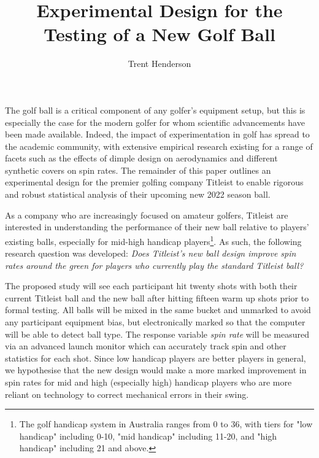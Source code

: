 \documentclass{article}
\begin{document}
\title{\vspace{-4cm}Experimental Design for the Testing of a New Golf Ball}
\author{Trent Henderson}
\date{}

\maketitle

The golf ball is a critical component of any golfer's equipment setup, but this is especially the case for the modern golfer for whom scientific advancements have been made available. 
Indeed, the impact of experimentation in golf has spread to the academic community, with extensive empirical research existing for a range of facets such as the effects of dimple design on aerodynamics and different synthetic covers on spin rates. 
The remainder of this paper outlines an experimental design for the premier golfing company Titleist to enable rigorous and robust statistical analysis of their upcoming new 2022 season ball.

As a company who are increasingly focused on amateur golfers, Titleist are interested in understanding the performance of their new ball relative to players' existing balls, especially for mid-high handicap players\footnote{The golf handicap system in Australia ranges from 0 to 36, with tiers for "low handicap" including 0-10, "mid handicap" including 11-20, and "high handicap" including 21 and above.}. 
As such, the following research question was developed: \textit{Does Titleist's new ball design improve spin rates around the green for players who currently play the standard Titleist ball?} 

The proposed study will see each participant hit twenty shots with both their current Titleist ball and the new ball after hitting fifteen warm up shots prior to formal testing. 
All balls will be mixed in the same bucket and unmarked to avoid any participant equipment bias, but electronically marked so that the computer will be able to detect ball type.
The response variable \textit{spin rate} will be measured via an advanced launch monitor which can accurately track spin and other statistics for each shot.
Since low handicap players are better players in general, we hypothesise that the new design would make a more marked improvement in spin rates for mid and high (especially high) handicap players who are more reliant on technology to correct mechanical errors in their swing.
\end{document}
